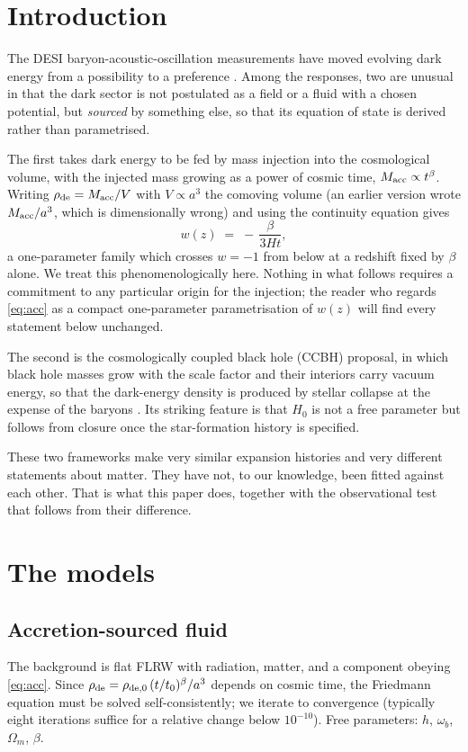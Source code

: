 \documentclass[11pt,a4paper]{article}
\begin{document}
\section{Introduction}

The DESI baryon-acoustic-oscillation measurements have moved evolving dark energy from a
possibility to a preference \citep{DESIDR2BAO_C}. Among the responses, two are unusual in that the dark
sector is not postulated as a field or a fluid with a chosen potential, but \emph{sourced} by
something else, so that its equation of state is derived rather than parametrised.

The first takes dark energy to be fed by mass injection into the cosmological volume, with the
injected mass growing as a power of cosmic time, $M_{\rm acc} \propto t^{\beta}$. Writing
$\rho_{\rm de} = M_{\rm acc}/V$ with $V \propto a^3$ the comoving volume (an earlier version wrote $M_{\rm acc}/a^3$, which is dimensionally wrong) and using the continuity equation gives
\begin{equation}
w(z) \;=\; -\,\frac{\beta}{3Ht},
\label{eq:acc}
\end{equation}
a one-parameter family which crosses $w = -1$ from below at a redshift fixed by $\beta$ alone. We
treat this phenomenologically here. Nothing in what follows requires a commitment to any particular
origin for the injection; the reader who regards \eqref{eq:acc} as a compact one-parameter
parametrisation of $w(z)$ will find every statement below unchanged.

The second is the cosmologically coupled black hole (CCBH) proposal, in which black hole masses
grow with the scale factor and their interiors carry vacuum energy, so that the dark-energy density
is produced by stellar collapse at the expense of the baryons \citep{Farrah2023,Croker2024}. Its
striking feature is that $H_0$ is not a free parameter but follows from closure once the
star-formation history is specified.

These two frameworks make very similar expansion histories and very different statements about
matter. They have not, to our knowledge, been fitted against each other. That is what this paper
does, together with the observational test that follows from their difference.

\section{The models}

\subsection{Accretion-sourced fluid}
The background is flat FLRW with radiation, matter, and a component obeying \eqref{eq:acc}. Since
$\rho_{\rm de} = \rho_{\rm de,0}\,(t/t_0)^{\beta}/a^3$ depends on cosmic time, the Friedmann
equation must be solved self-consistently; we iterate to convergence (typically eight iterations
suffice for a relative change below $10^{-10}$). Free parameters: $h$, $\omega_b$, $\Omega_m$,
$\beta$.
\end{document}
